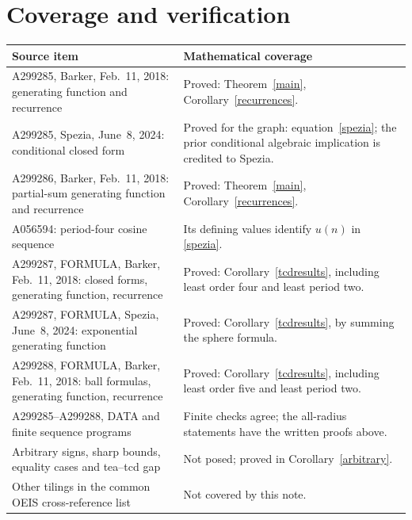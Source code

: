\documentclass[11pt]{article}
\begin{document}
\section{Coverage and verification}
\noindent\begin{tabular}{@{}p{.48\linewidth}p{.47\linewidth}@{}}
\toprule
Source item & Mathematical coverage\\\midrule
A299285, Barker, Feb.~11, 2018: generating function and recurrence
& Proved: Theorem~\ref{main}, Corollary~\ref{recurrences}.\\[3pt]
A299285, Spezia, June~8, 2024: conditional closed form
& Proved for the graph: equation~\eqref{spezia}; the prior conditional algebraic implication is credited to Spezia.\\[3pt]
A299286, Barker, Feb.~11, 2018: partial-sum generating function and recurrence
& Proved: Theorem~\ref{main}, Corollary~\ref{recurrences}.\\[3pt]
A056594: period-four cosine sequence
& Its defining values identify $u(n)$ in \eqref{spezia}.\\[3pt]
A299287, FORMULA, Barker, Feb.~11, 2018: closed forms, generating function, recurrence
& Proved: Corollary~\ref{tcdresults}, including least order four and least period two.\\[3pt]
A299287, FORMULA, Spezia, June~8, 2024: exponential generating function
& Proved: Corollary~\ref{tcdresults}, by summing the sphere formula.\\[3pt]
A299288, FORMULA, Barker, Feb.~11, 2018: ball formulas, generating function, recurrence
& Proved: Corollary~\ref{tcdresults}, including least order five and least period two.\\[3pt]
A299285--A299288, DATA and finite sequence programs
& Finite checks agree; the all-radius statements have the written proofs above.\\[3pt]
Arbitrary signs, sharp bounds, equality cases and tea--tcd gap
& Not posed; proved in Corollary~\ref{arbitrary}.\\[3pt]
Other tilings in the common OEIS cross-reference list
& Not covered by this note.\\\bottomrule
\end{tabular}
\end{document}
